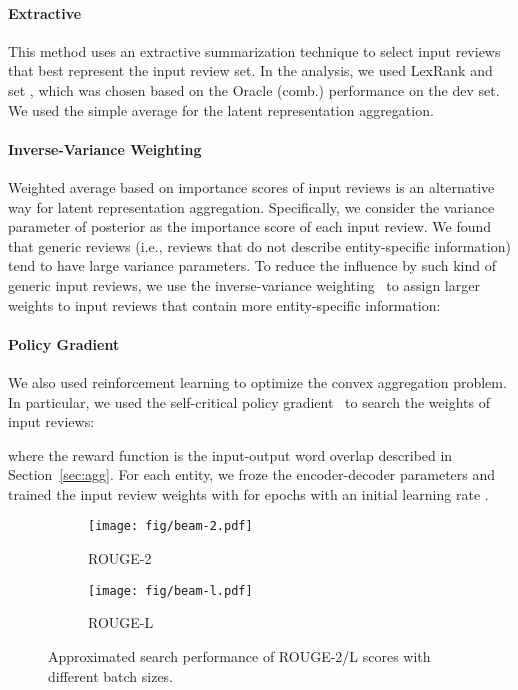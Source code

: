 \documentclass[11pt]{article}
\begin{document}
\paragraph{Extractive} This method uses an extractive summarization technique to select  input reviews that best represent the input review set. In the analysis, we used LexRank and set , which was chosen based on the Oracle (comb.) performance on the dev set. We used the simple average for the latent representation aggregation.

\paragraph{Inverse-Variance Weighting}
Weighted average based on importance scores of input reviews is an alternative way for latent representation aggregation.
Specifically, we consider the variance parameter of posterior  as the importance score of each input review.
We found that generic reviews (i.e., reviews that do not describe entity-specific information) tend to have  large variance parameters. To reduce the influence by such kind of generic input reviews,
we use the inverse-variance weighting~\cite{cochran1954combination} to assign larger weights to input reviews that contain more entity-specific information:


\paragraph{Policy Gradient} We also used reinforcement learning to optimize the convex aggregation problem.
In particular, we used the self-critical policy gradient~\citep[PG;][]{rennie2017self, paulus2018deep} to search the weights of input reviews:

where the reward function  is the input-output word overlap described in Section~\ref{sec:agg}. For each entity, we froze the encoder-decoder parameters and trained the input review weights with  for  epochs with an initial learning rate .

\begin{figure}[t]
    \centering
    \begin{subfigure}[b]{0.99\linewidth}
        \centering
        \texttt{[image: fig/beam-2.pdf]}
        \caption{ROUGE-2}
        \label{fig:beam-2}
    \end{subfigure}
    \begin{subfigure}[b]{0.99\linewidth}
        \centering
        \texttt{[image: fig/beam-l.pdf]}
        \caption{ROUGE-L}
        \label{fig:beam-l}
    \end{subfigure}
    \caption{Approximated search performance of ROUGE-2/L scores with different batch sizes.}
    \label{fig:beam-2l}
\end{figure}
\end{document}

